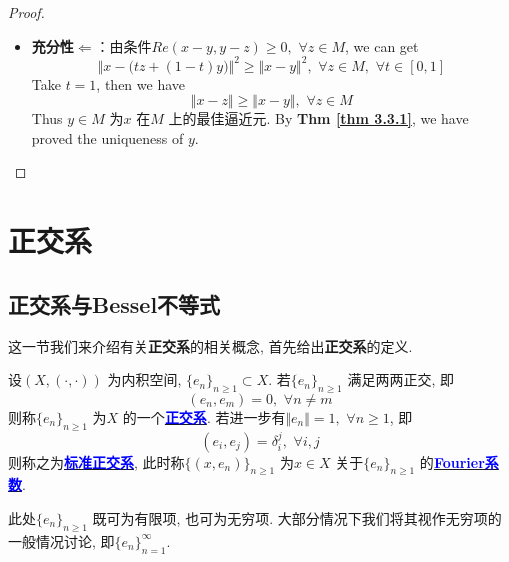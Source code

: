 \begin{thm}
\begin{proof}
\begin{itemize}
				\vspace{4em}
				
				\item \textbf{充分性$\Leftarrow$}：由条件$Re(x - y , y - z) \geq 0 , \,\, \forall z \in M$, we can get
				\[ \Big\Vert x - \Big( tz + (1 - t)y \Big) \Big\Vert^2 \geq \Vert x - y \Vert^2 , \,\, \forall z \in M , \,\, \forall t \in [0 , 1] \]
				Take $t = 1$, then we have
				\[ \Vert x - z \Vert \geq \Vert x - y \Vert , \,\, \forall z \in M \]
				Thus $y \in M$ 为$x$ 在$M$ 上的最佳逼近元. By \textbf{Thm \ref{thm 3.3.1}}, we have proved the uniqueness of $y$. 
			\end{itemize}
		\end{proof}
	\end{thm}

\newpage

\section{正交系}
\subsection{正交系与Bessel不等式}
	这一节我们来介绍有关\textbf{正交系}的相关概念, 首先给出\textbf{正交系}的定义. 
	
	\vspace{1em}
	
	\begin{defn}\label{def 3.4.1}
		设$(X , (\cdot , \cdot))$ 为内积空间, $\{ e_n \}_{n \geq 1} \subset X$. 若$\{ e_n \}_{n \geq 1}$ 满足两两正交, 即
		\[ (e_n , e_m) = 0 , \,\, \forall n \neq m \]
		则称$\{ e_n \}_{n \geq 1}$ 为$X$ 的一个\underline{\textcolor{blue}{\textbf{正交系}}}. 若进一步有$\Vert e_n \Vert = 1 , \,\, \forall n \geq 1$, 即
		\[ (e_i , e_j) = \delta_{i}^{j} , \,\, \forall i , j \]
		则称之为\underline{\textcolor{blue}{\textbf{标准正交系}}}, 此时称$\{ (x , e_n) \}_{n \geq 1}$ 为$x \in X$ 关于$\{ e_n \}_{n \geq 1}$ 的\underline{\textcolor{blue}{\textbf{Fourier系数}}}. 
		
		\vspace{2em}
		
		\begin{rmk}
			此处$\{ e_n \}_{n \geq 1}$ 既可为有限项, 也可为无穷项. 大部分情况下我们将其视作无穷项的一般情况讨论, 即$\{ e_n \}_{n = 1}^{\infty}$.
		\end{rmk}
	\end{defn}
	
	\vspace{6em}
	
